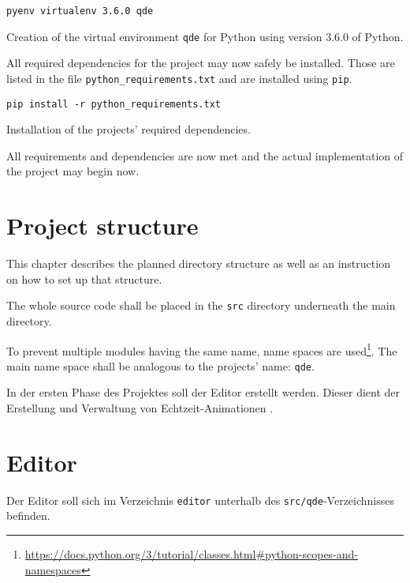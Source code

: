 \documentclass[10pt, openright, notitlepage]{scrreprt}
\begin{document}
\begin{listing}[H]
\begin{verbatim}
pyenv virtualenv 3.6.0 qde
\end{verbatim}
\caption{\label{org645be09}
Creation of the virtual environment \texttt{qde} for Python using version 3.6.0 of Python.}
\end{listing}

All required dependencies for the project may now safely be installed. Those are
listed in the file \texttt{python\_requirements.txt} and are installed using \texttt{pip}.

\begin{listing}[H]
\begin{verbatim}
pip install -r python_requirements.txt
\end{verbatim}
\caption{\label{org7e6f3c8}
Installation of the projects' required dependencies.}
\end{listing}

All requirements and dependencies are now met and the actual implementation of
the project may begin now.

\section{Project structure}
\label{sec:org06c4f56}

This chapter describes the planned directory structure as well as an instruction
on how to set up that structure.

The whole source code shall be placed in the \texttt{src} directory underneath the main
directory.

To prevent multiple modules having the same name, name spaces are
used\footnote{\url{https://docs.python.org/3/tutorial/classes.html\#python-scopes-and-namespaces}}.
The main name space shall be analogous to the projects' name: \texttt{qde}.

In der ersten Phase des Projektes soll der Editor erstellt werden. Dieser dient
der Erstellung und Verwaltung von Echtzeit-Animationen \cite[S. 29]{osterwalder_qde_2016}.

\section{Editor}
\label{sec:orgc5a3405}

Der Editor soll sich im Verzeichnis \texttt{editor} unterhalb des \texttt{src/qde}-Verzeichnisses
befinden.
\end{document}
